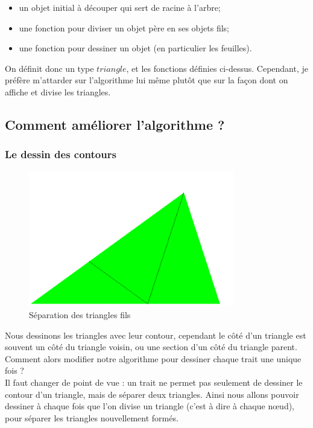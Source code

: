 \documentclass[a4paper,11pt]{article}
\begin{document}
\begin{itemize}
  \item un objet initial à découper qui sert de racine à l'arbre;
  \item une fonction pour diviser un objet père en ses objets fils;
  \item une fonction pour dessiner un objet (en particulier les feuilles).\\
\end{itemize}

On définit donc un type $triangle$, et les fonctions définies ci-dessus. Cependant,
je préfère m'attarder sur l'algorithme lui même plutôt que sur la façon dont on affiche
et divise les triangles.

\subsection{Comment améliorer l'algorithme ?}

\subsubsection{Le dessin des contours}
\begin{figure}
  \centering
  \includegraphics[width=0.8\textwidth]{penrose_inline1.png}
  \caption{Séparation des triangles fils}
  \label{fig:penrose_example}
\end{figure}
Nous dessinons les triangles avec leur contour, cependant le côté d'un triangle est souvent
un côté du triangle voisin, ou une section d'un côté du triangle parent.\\

Comment alors modifier notre algorithme pour dessiner chaque trait une unique fois ?\\

Il faut changer de point de vue : un trait ne permet pas seulement de dessiner le contour
d'un triangle, mais de séparer deux triangles. Ainsi nous allons pouvoir dessiner à chaque fois
que l'on divise un triangle (c'est à dire à chaque nœud), pour séparer
les triangles nouvellement formés.\\
\end{document}
